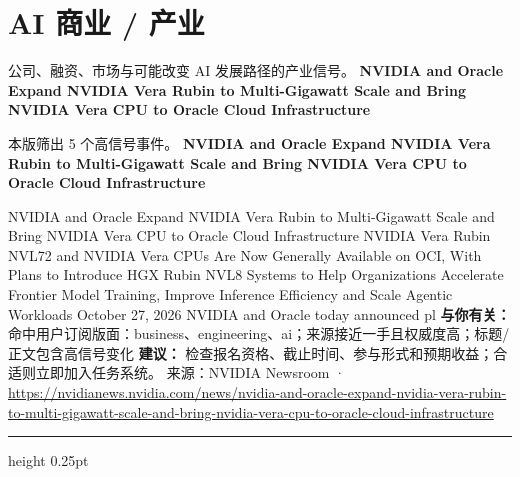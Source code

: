 \documentclass[10.5pt]{ctexart}
\begin{document}
\section*{AI 商业 / 产业}
{\color{ormuted} 公司、融资、市场与可能改变 AI 发展路径的产业信号。}
\vspace{2mm}
{\LARGE\bfseries NVIDIA and Oracle Expand NVIDIA Vera Rubin to Multi-Gigawatt Scale and Bring NVIDIA Vera CPU to Oracle Cloud Infrastructure}\par
\vspace{1mm}
{\color{ormuted} 本版筛出 5 个高信号事件。}
\vspace{3mm}
{\Large\bfseries NVIDIA and Oracle Expand NVIDIA Vera Rubin to Multi-Gigawatt Scale and Bring NVIDIA Vera CPU to Oracle Cloud Infrastructure}\par
NVIDIA and Oracle Expand NVIDIA Vera Rubin to Multi-Gigawatt Scale and Bring NVIDIA Vera CPU to Oracle Cloud Infrastructure NVIDIA Vera Rubin NVL72 and NVIDIA Vera CPUs Are Now Generally Available on OCI, With Plans to Introduce HGX Rubin NVL8 Systems to Help Organizations Accelerate Frontier Model Training, Improve Inference Efficiency and Scale Agentic Workloads October 27, 2026 NVIDIA and Oracle today announced pl
\textbf{与你有关：} 命中用户订阅版面：business、engineering、ai；来源接近一手且权威度高；标题/正文包含高信号变化
\textbf{建议：} 检查报名资格、截止时间、参与形式和预期收益；合适则立即加入任务系统。
{\footnotesize\color{ormuted} 来源：NVIDIA Newsroom · \url{https://nvidianews.nvidia.com/news/nvidia-and-oracle-expand-nvidia-vera-rubin-to-multi-gigawatt-scale-and-bring-nvidia-vera-cpu-to-oracle-cloud-infrastructure}}
\vspace{4mm}
\hrule height 0.25pt
\vspace{3mm}
\end{document}
